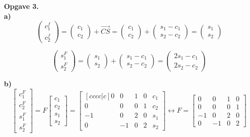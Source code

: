 \documentclass[12pt]{article}
\begin{document}
{\textbf{\large Opgave 3.}\\

\textbf{a)}\\
\[
\left (
\begin{matrix}
c_1^f \\
c_2^f
\end{matrix}
\right )
=
\left (
\begin{matrix}
c_1\\
c_2
\end{matrix}
\right )
+
\vec {CS}
=
\left (
\begin{matrix}
c_1\\
c_2
\end{matrix}
\right )
+
\left (
\begin{matrix}
s_1 - c_1 \\
s_2 -c_2 
\end{matrix}
\right )
=
\left (
\begin{matrix}
s_1\\
s_2
\end{matrix}
\right )
\]

\[
\left (
\begin{matrix}
s_1^F\\
s_2^F
\end{matrix}
\right ) =
\left (
\begin{matrix}
s_1\\
s_2
\end{matrix}
\right ) + 
\left (
\begin{matrix}
s_1 - c_1\\
s_2 - c_2
\end{matrix}
\right ) = 
\left (
\begin{matrix}
2s_1 - c_1\\
2s_2 - c_2
\end{matrix}
\right ) 
\]

\textbf{b)}\\
$$
\begin{bmatrix}
c_1^F \\ c_2^F \\ s_1^F \\ s_2^F
\end{bmatrix} = F 
\begin{bmatrix}
c_1 \\ c_2 \\ s_1 \\ s_2
\end{bmatrix} = 
\begin{bmatrix}[cccc|c]
0 & 0 & 1 & 0 & c_1 \\ 
0 & 0 & 0 & 1 & c_2 \\ 
-1 & 0  & 2 & 0 & s_1 \\ 
0 & -1 & 0 & 2 & s_2
\end{bmatrix} 
\leftrightarrow F = 
\begin{bmatrix}
0 & 0 & 1 & 0 \\
0 & 0 & 0 & 1  \\ 
-1 & 0  & 2 &  0 \\ 
0 & -1 & 0 & 2 
\end{bmatrix} 
$$

}
\end{document}
